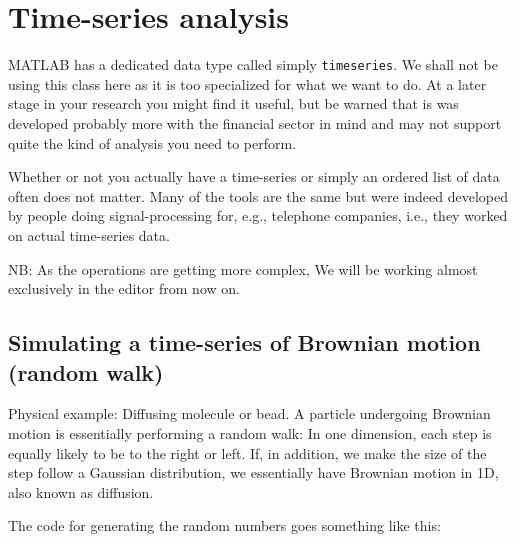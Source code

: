 \section{Time-series analysis}
MATLAB has a dedicated data type called simply \lstinline{timeseries}.
We shall not be using this class here as it is too specialized for what we want to do.
At a later stage in your research you might find it useful, but be warned that is was developed probably more with the financial sector in mind and may not support quite the kind of analysis you need to perform.

Whether or not you actually have a time-series or simply an ordered list of data often does not matter. Many of the tools are the same but were indeed developed by people doing signal-processing for, e.g., telephone companies, i.e., they worked on actual time-series data.

NB: As the operations are getting more complex, We will be working almost exclusively in the editor from now on.

\subsection{Simulating a time-series of Brownian motion (random walk)}
Physical example: Diffusing molecule or bead.
A particle undergoing Brownian motion is essentially performing a random walk: In one dimension, each step is equally likely to be to the right or left.  If, in addition, we make the size of the step follow a Gaussian distribution, we essentially have Brownian motion in 1D, also known as diffusion.

The code for generating the random numbers goes something like this: